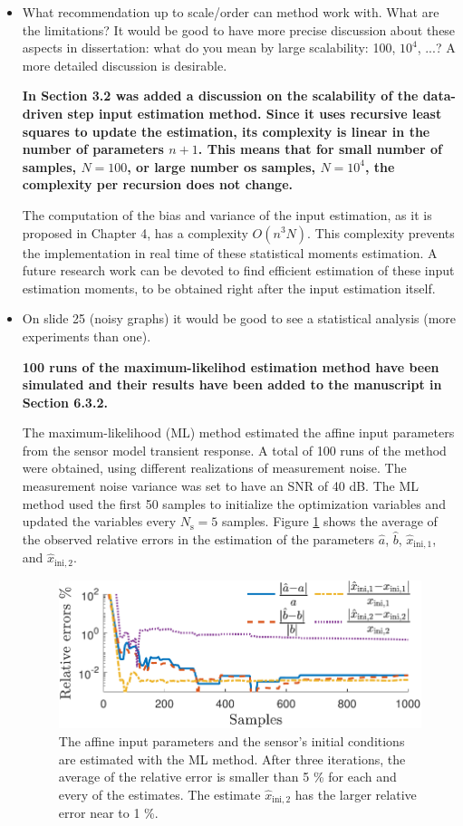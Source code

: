 \documentclass[11pt]{article}
\begin{document}
\begin{itemize}
	\item  What recommendation up to scale/order can method work with. What are the limitations? It would be good to have more precise discussion about these aspects in dissertation: what do you mean by large scalability: 100, $10^4$, ...? A more detailed discussion is desirable.
	
	{\bfseries In Section 3.2 was added a discussion on the scalability of the data-driven step input estimation method. Since it uses recursive least squares to update the estimation, its complexity is linear in the number of parameters $n+1$. This means that for small number of samples, $N=100$, or large number os samples, $N=10^4$, the complexity per recursion does not change.
	
	The computation of the bias and variance of the input estimation, as it is proposed in Chapter 4, has a complexity $O(n^3N)$. This complexity prevents the implementation in real time of these statistical moments estimation. A future research work can be devoted to find efficient estimation of these input estimation moments, to be obtained right after the input estimation itself. }
	
	\item  On slide 25 (noisy graphs) it would be good to see a statistical analysis (more experiments than one).
	
    {\bfseries 100 runs of the maximum-likelihod estimation method have been simulated and their results have been added to the manuscript in Section 6.3.2.}
	
	\color{blue} 
    The maximum-likelihood (ML) method estimated the affine input parameters from the sensor model transient response.
    A total of 100 runs of the method were obtained, using different realizations of measurement noise.
    The measurement noise variance was set to have an SNR of 40 dB.
    The ML method used the first 50 samples to initialize the optimization variables and updated the variables every $N_{\mathrm{s}} = 5$ samples.
    Figure \ref{fig:rele_lo_40dB_s10} shows the average of the observed relative errors in the estimation of the parameters $\widehat{a}$, $\widehat{b}$, $\widehat{x}_{\mathrm{ini,1}}$, and $\widehat{x}_{\mathrm{ini,2}}$.
    
    \renewcommand{\thefigure}{6.8}
    \begin{figure}[!htbp]
    \centering
    \includegraphics[width=0.6\columnwidth]{../ChapterRampInput/fig/Fig_7.pdf} 
    \caption{ \label{fig:rele_lo_40dB_s10} The affine input parameters and the sensor's initial conditions are estimated with the ML method. After three iterations, \color{blue} the average of the relative error is smaller than 5 \% for each and every of the estimates. The estimate $\widehat{x}_{\mathrm{ini,2}}$ has the larger relative error near to 1 \%. \color{black} }
    \end{figure}


\end{itemize}
\end{document}
